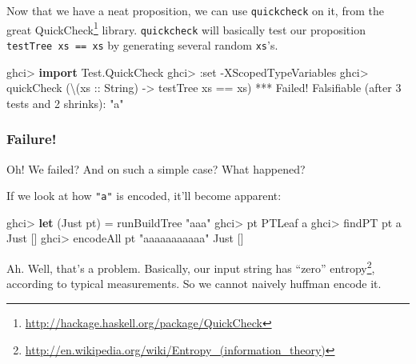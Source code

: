 \documentclass[]{article}
\newenvironment{Shaded}{}{}
\newcommand{\CharTok}[1]{\textcolor[rgb]{0.25,0.44,0.63}{#1}}
\newcommand{\DataTypeTok}[1]{\textcolor[rgb]{0.56,0.13,0.00}{#1}}
\newcommand{\DecValTok}[1]{\textcolor[rgb]{0.25,0.63,0.44}{#1}}
\newcommand{\FunctionTok}[1]{\textcolor[rgb]{0.02,0.16,0.49}{#1}}
\newcommand{\KeywordTok}[1]{\textcolor[rgb]{0.00,0.44,0.13}{\textbf{#1}}}
\newcommand{\NormalTok}[1]{#1}
\newcommand{\OperatorTok}[1]{\textcolor[rgb]{0.40,0.40,0.40}{#1}}
\newcommand{\OtherTok}[1]{\textcolor[rgb]{0.00,0.44,0.13}{#1}}
\newcommand{\StringTok}[1]{\textcolor[rgb]{0.25,0.44,0.63}{#1}}
\renewcommand{\href}[2]{#2\footnote{\url{#1}}}
\begin{document}
Now that we have a neat proposition, we can use \texttt{quickcheck} on it, from
the great \href{http://hackage.haskell.org/package/QuickCheck}{QuickCheck}
library. \texttt{quickcheck} will basically test our proposition
\texttt{testTree\ xs\ ==\ xs} by generating several random \texttt{xs}'s.

\begin{Shaded}
\begin{Highlighting}[]
\NormalTok{ghci}\OperatorTok{>} \KeywordTok{import} \DataTypeTok{Test.QuickCheck}
\NormalTok{ghci}\OperatorTok{>} \OperatorTok{:}\NormalTok{set }\OperatorTok{{-}}\DataTypeTok{XScopedTypeVariables}
\NormalTok{ghci}\OperatorTok{>}\NormalTok{ quickCheck (\textbackslash{}(}\OtherTok{xs ::} \DataTypeTok{String}\NormalTok{) }\OtherTok{{-}>}\NormalTok{ testTree xs }\OperatorTok{==}\NormalTok{ xs)}
\OperatorTok{***} \DataTypeTok{Failed}\OperatorTok{!} \DataTypeTok{Falsifiable}\NormalTok{ (after }\DecValTok{3}\NormalTok{ tests }\FunctionTok{and} \DecValTok{2}\NormalTok{ shrinks)}\OperatorTok{:}
\StringTok{"a"}
\end{Highlighting}
\end{Shaded}

\hypertarget{failure}{%
\subsubsection{Failure!}\label{failure}}

Oh! We failed? And on such a simple case? What happened?

If we look at how \texttt{"a"} is encoded, it'll become apparent:

\begin{Shaded}
\begin{Highlighting}[]
\NormalTok{ghci}\OperatorTok{>} \KeywordTok{let}\NormalTok{ (}\DataTypeTok{Just}\NormalTok{ pt) }\OtherTok{=}\NormalTok{ runBuildTree }\StringTok{"aaa"}
\NormalTok{ghci}\OperatorTok{>}\NormalTok{ pt}
\DataTypeTok{PTLeaf} \CharTok{\textquotesingle{}a\textquotesingle{}}
\NormalTok{ghci}\OperatorTok{>}\NormalTok{ findPT pt }\CharTok{\textquotesingle{}a\textquotesingle{}}
\DataTypeTok{Just}\NormalTok{ []}
\NormalTok{ghci}\OperatorTok{>}\NormalTok{ encodeAll pt }\StringTok{"aaaaaaaaaaa"}
\DataTypeTok{Just}\NormalTok{ []}
\end{Highlighting}
\end{Shaded}

Ah. Well, that's a problem. Basically, our input string has
\href{http://en.wikipedia.org/wiki/Entropy_(information_theory)}{``zero''
entropy}, according to typical measurements. So we cannot naively huffman encode
it.
\end{document}
